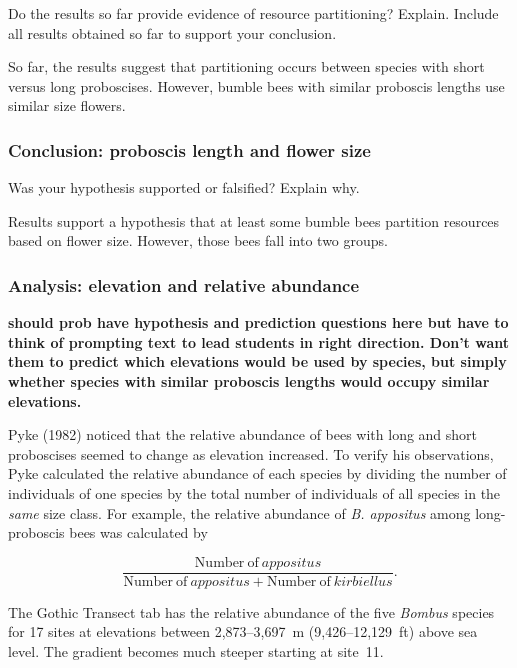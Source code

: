 \documentclass[12pt, hidelinks]{exam}
\newcommand*\AnswerBox[2]{%
    \parbox[t][#1]{0.92\textwidth}{%
    \begin{solution}#2\end{solution}}
    \vspace{\stretch{1}}
}
\begin{document}
\begin{questions}
\question[Checkout]
Do the results so far provide evidence of resource partitioning?  Explain. Include all results obtained so far to support your conclusion.

\AnswerBox{0.1\textheight}{So far, the results suggest that partitioning
occurs between species with short versus long proboscises. However, bumble
bees with similar proboscis lengths use similar size flowers.}

\subsubsection*{Conclusion: proboscis length and flower size}

\question[Checkout]
Was your hypothesis supported or falsified? Explain why.

\AnswerBox{0.1\textheight}{Results support a hypothesis that at least some bumble bees partition resources based on flower size. However, those bees fall into two groups.}

\subsubsection*{Analysis: elevation and relative abundance}

\textbf{should prob have hypothesis and prediction questions here
but have to think of prompting text to lead students in right 
direction. Don't want them to predict which elevations would be
used by species, but simply whether species with similar proboscis
lengths would occupy similar elevations.}

Pyke (1982) noticed that the relative abundance of bees with long 
and short proboscises seemed to change as elevation increased. To 
verify his observations, Pyke calculated the relative abundance
of each species by dividing the number of individuals of
one species by the total number of individuals of all species in
the \emph{same} size class. For example, the relative abundance
of \textit{B. appositus} among long-proboscis bees was calculated by

\begin{equation*}
\dfrac{\mathrm{Number~of}~appositus}{\mathrm{Number~of}~appositus + 
\mathrm{Number~of}~kirbiellus}.
\end{equation*}

The Gothic Transect tab has the relative abundance of the five 
\textit{Bombus} species for 17 sites at elevations between 
2,873–3,697~m (9,426–12,129~ft) above sea level. The gradient becomes much steeper starting at site~11.


\end{questions}
\end{document}
